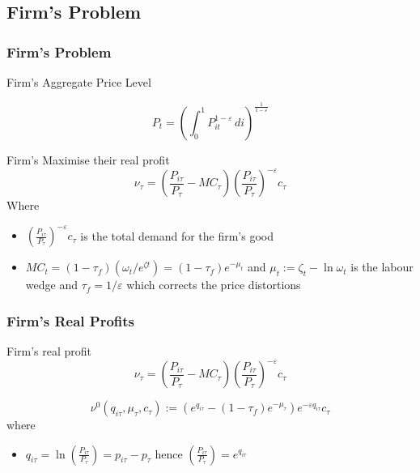 \documentclass{beamer}
\begin{document}
\subsection{Firm's Problem}

\subsubsection{Firm's Problem}
\begin{frame}{\subsecname}
Firm's Aggregate Price Level

\begin{equation}\tag{13}
    P_{t}=\left(\int_{0}^{1}P_{it}^{1-\varepsilon}\,di\right)^{\frac{1}{1-\varepsilon}}
\end{equation}

Firm's Maximise their real profit
\begin{equation*}
    \nu_{\tau} = \left(\frac{P_{i\tau}}{P_{\tau}}-MC_{\tau}\right)\left(\frac{P_{i\tau}}{P_{\tau}}\right)^{-\varepsilon} c_{\tau}
\end{equation*}
Where
\begin{itemize}
\item    $\left(\frac{P_{i\tau}}{P_{\tau}}\right)^{-\varepsilon} c_{\tau}$ is the total demand for the firm's good 
\item $MC_{t}=(1-\tau_{f})(\omega_{t}/e^{\zeta{t}})=(1-\tau_{f})e^{-\mu_{t}}$ and $\mu_{t} :=\zeta_{t}- \ln \omega_{t}$ is the labour wedge and $\tau_{f}= 1/\varepsilon$ which corrects the price distortions
\end{itemize}
 
    

\end{frame}
\subsubsection{Firm's Real Profits}
\begin{frame}{\subsecname}
Firm's real profit
\begin{equation*}
    \nu_{\tau} = \left(\frac{P_{i\tau}}{P_{\tau}}-MC_{\tau}\right)\left(\frac{P_{i\tau}}{P_{\tau}}\right)^{-\varepsilon} c_{\tau}
\end{equation*}

\begin{equation}\tag{14}
    \nu^{0}(q_{i\tau},\mu_{\tau},c_{\tau}):=\left(e^{q_{i\tau}}-(1-\tau_{f})e^{-\mu_{\tau}}\right)e^{-\varepsilon q_{i\tau}}c_{\tau}
\end{equation} where 
\begin{itemize}
    \item  $q_{i\tau}=\ln\left(\frac{P_{i\tau}}{P_{\tau}}\right)= p_{i\tau}-p_{\tau}$ hence $\left(\frac{P_{i\tau}}{P_{\tau}}\right)= e^{q_{i\tau}}$
\end{itemize}


\end{frame}
\end{document}

